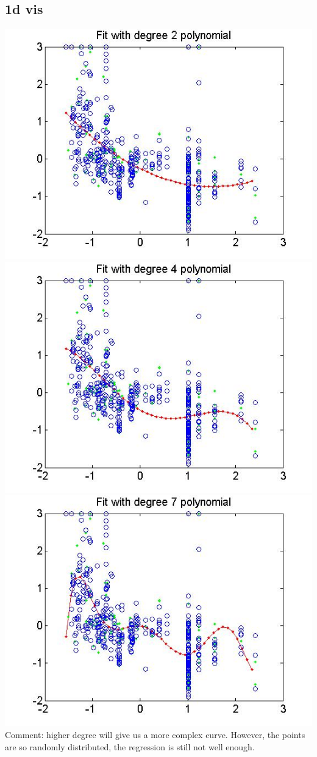 \documentclass[paper=a4, fontsize=11pt]{article} %
\begin{document}
\subsection{1d vis}
\includegraphics[width=\linewidth]{degree2_1d.jpg}
\includegraphics[width=\linewidth]{degree4_1d.jpg}
\includegraphics[width=\linewidth]{degree7_1d.jpg}
Comment: higher degree will give us a more complex curve. However, the points are so randomly distributed, the regression is still not well enough.
\end{document}
